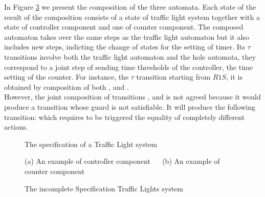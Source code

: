 \documentclass[runningheads]{llncs}
\begin{document}
In Figure \ref{fig:tlf} we present the composition of the three automata. Each state of the result of the composition consists  of  a state of traffic light system together with a state of controller component and one of counter component. The composed automaton  takes over  the same steps as the traffic light automaton but it also includes new steps,  indicting the change of states for the setting of timer. Its $\tau$ transitions involve both the traffic light automaton and the hole  automata, they correspond to  a joint step of  sending time thresholds of the controller, the time setting of the counter. For instance, the  $\tau$  transition starting from \(R1S\), it is obtained by composition of both 
,  and   . \\ 
However, the joint composition of transitions  ,  and 
 is not agreed because it would produce a transition whose guard is not satisfiable. It will produce the following transition:  which requires to be triggered  the equality of completely different actions. 








\begin{figure}[!tb]
\centering
\scalebox{.75}{}
\caption{The specification of a Traffic Light system}
\label{fig:tls}
\end{figure}


\begin{figure}[!tb]
\scalebox{.75}{}
\scalebox{.75}{}
\caption{(a) An example of controller component ~~  (b) An example of counter component}
\label{fig:ctlandcnt}
\end{figure}

\begin{figure}[!tb]
\centering
\scalebox{.75}{}
\caption{The incomplete Specification Traffic Lights system}
\label{fig:tlf}
\end{figure}
\end{document}
